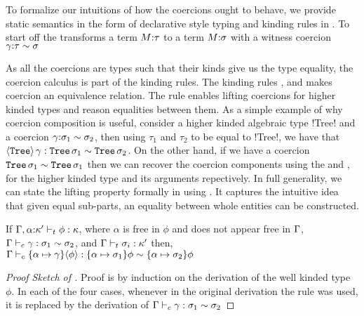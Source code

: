 \documentclass[manuscript,screen,nonacm]{acmart}
\begin{document}
To formalize our intuitions of how the coercions ought to behave, we provide static semantics in the form of declarative style typing and kinding rules in . To start off the  transforms a term $M{:}\tau$ to a term $M{:}\sigma$ with a witness coercion $\gamma{:}\tau\sim\sigma$

As all the coercions are types such that their kinds give us the type equality, the coercion calculus is part of the kinding rules. The kinding rules ,   and  makes coercion an equivalence relation. The rule  enables lifting coercions for higher kinded types and reason equalities between them. As a simple example of why coercion composition is useful, consider a higher kinded algebraic type !Tree! and a coercion $\gamma{:}\sigma_1\sim\sigma_2$, then using $\tau_1$ and $\tau_2$ to be equal to !Tree!, we have that $\langle\texttt{Tree}\rangle \,\gamma : \texttt{Tree}\,\sigma_1 \sim \texttt{Tree}\,\sigma_2$.
On the other hand, if we have a coercion $\texttt{Tree}\,\sigma_1 \sim \texttt{Tree}\,\sigma_1$ then we can recover the coercion components using the  and , for the higher kinded type and its arguments repectively. In full generality, we can state the lifting property formally in \SFC using .
It captures the intuitive idea that given equal sub-parts, an equality between whole entities can be constructed.
\begin{theorem}\label{thm:sfc-coercion-lifting}
  If $\Gamma,\alpha{:}\kappa' \vdash_{t} \phi : \kappa$, where $\alpha$ is free in $\phi$
  and does not appear free in $\Gamma$, 
  $\Gamma \vdash_{c} \gamma : \sigma_1\sim\sigma_2$, and $\Gamma \vdash_{t} \sigma_i : \kappa'$
  then, $\Gamma \vdash_{c} \{\alpha\mapsto \gamma\}\langle\phi\rangle : \{\alpha\mapsto\sigma_1\}\phi \sim \{\alpha\mapsto\sigma_2\}\phi$
\end{theorem}
\begin{proof}[Proof Sketch of ]
  Proof is by induction on the derivation of the well kinded type $\phi$. In each of the four cases, whenever in the original derivation the rule  was used, it is replaced by the derivation of $\Gamma \vdash_{c} \gamma : \sigma_1 \sim \sigma_2$ %
\end{proof}
\end{document}
